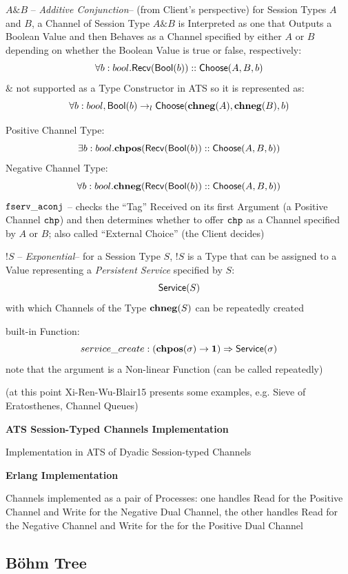 $A \& B$ -- \emph{Additive Conjunction}-- (from Client's perspective)
for Session Types $A$ and $B$, a Channel of Session Type $A \& B$ is
Interpreted as one that Outputs a Boolean Value and then Behaves as a
Channel specified by either $A$ or $B$ depending on whether the
Boolean Value is true or false, respectively:
\[
  \forall b : bool. \mathsf{Recv}(\mathsf{Bool}(b)) :: \mathsf{Choose}(A,B,b)
\]
$\&$ not supported as a Type Constructor in ATS so it is represented
as:
\[
  \forall b:bool,
    \mathsf{Bool}(b) \rightarrow_l \mathsf{Choose}(\mathbf{chneg}(A), \mathbf{chneg}(B), b)
\]

Positive Channel Type:
\[
  \exists b : bool. \mathbf{chpos}(\mathsf{Recv}(\mathsf{Bool}(b)) :: \mathsf{Choose}(A,B,b))
\]
Negative Channel Type:
\[
  \forall b : bool. \mathbf{chneg}(\mathsf{Recv}(\mathsf{Bool}(b)) :: \mathsf{Choose}(A,B,b))
\]
$\mathtt{fserv\_aconj}$ -- checks the ``Tag'' Received on its first
Argument (a Positive Channel $\mathtt{chp}$) and then determines whether
to offer $\mathtt{chp}$ as a Channel specified by $A$ or $B$; also
called ``External Choice'' (the Client decides)

$!S$ -- \emph{Exponential}-- for a Session Type $S$, $!S$ is a Type
that can be assigned to a Value representing a \emph{Persistent
  Service} specified by $S$:
\[
  \mathsf{Service}(S)
\]
with which Channels of the Type $\mathbf{chneg}(S)$ can be repeatedly created

built-in Function:
\[
  service\_create :
    (\mathbf{chpos}(\sigma) \rightarrow \mathbf{1}) \Rightarrow \mathsf{Service}(\sigma)
\]
note that the argument is a Non-linear Function (can be called
repeatedly)

(at this point Xi-Ren-Wu-Blair15 presents some examples, e.g. Sieve of
Eratosthenes, Channel Queues)


\textbf{ATS Session-Typed Channels Implementation}

Implementation in ATS of Dyadic Session-typed Channels


\textbf{Erlang Implementation}

Channels implemented as a pair of Processes: one handles Read for the
Positive Channel and Write for the Negative Dual Channel, the other
handles Read for the Negative Channel and Write for the for the
Positive Dual Channel %


\endgroup



\subsection{B\"ohm Tree}\label{sec:bohm_tree}

